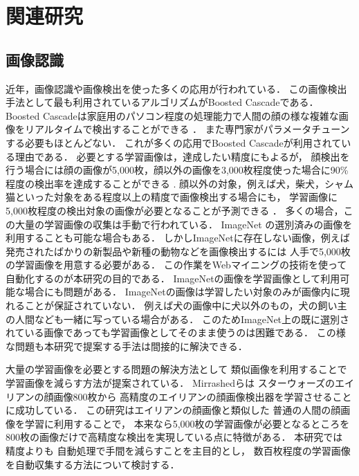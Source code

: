 \documentclass{deimj}
\begin{document}
\section{関連研究}
\label{sec:related}

\subsection{画像認識}
\label{sec:rel-image}

近年，画像認識や画像検出を使った多くの応用が行われている．
この画像検出手法として最も利用されているアルゴリズムがBoosted Cascade\cite{Viola01rapidobject}である．
Boosted Cascadeは家庭用のパソコン程度の処理能力で人間の顔の様な複雑な画像をリアルタイムで検出することができる
\cite{Bradsky08a}．
また専門家がパラメータチューンする必要もほとんどない．
これが多くの応用でBoosted Cascadeが利用されている理由である．
必要とする学習画像は，達成したい精度にもよるが，
顔検出を行う場合には顔の画像が5,000枚，顔以外の画像を3,000枚程度使った場合に90\%程度の検出率を達成することができる
\cite{Lienhart03empiricalanalysis}
.
顔以外の対象，例えば犬，柴犬，シャム猫といった対象をある程度以上の精度で画像検出する場合にも，
学習画像に5,000枚程度の検出対象の画像が必要となることが予測できる
\cite{conf/eccv/ZhangST08}
．
多くの場合，この大量の学習画像の収集は手動で行われている．
ImageNet\cite{imagenet}
の選別済みの画像を利用することも可能な場合もある．
しかしImageNetに存在しない画像，例えば発売されたばかりの新製品や新種の動物などを画像検出するには
人手で5,000枚の学習画像を用意する必要がある．
この作業をWebマイニングの技術を使って自動化するのが本研究の目的である．
ImageNetの画像を学習画像として利用可能な場合にも問題がある．
ImageNetの画像は学習したい対象のみが画像内に現れることが保証されていない．
例えば犬の画像中に犬以外のもの，犬の飼い主の人間なども一緒に写っている場合がある．
このためImageNet上の既に選別されている画像であっても学習画像としてそのまま使うのは困難である．
この様な問題も本研究で提案する手法は間接的に解決できる．

大量の学習画像を必要とする問題の解決方法として
類似画像を利用することで学習画像を減らす方法が提案されている．
Mirrashed\cite{Mirrashed_2013_ICCV}らは
スターウォーズのエイリアンの顔画像800枚から
高精度のエイリアンの顔画像検出器を学習させることに成功している．
この研究はエイリアンの顔画像と類似した
普通の人間の顔画像を学習に利用することで，
本来なら5,000枚の学習画像が必要となるところを
800枚の画像だけで高精度な検出を実現している点に特徴がある．
本研究では
精度よりも
自動処理で手間を減らすことを主目的とし，
数百枚程度の学習画像を自動収集する方法について検討する．
\end{document}
